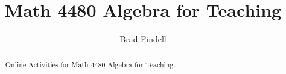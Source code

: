 \documentclass[numbers,nooutcomes,twoside,handout,hints]{xourse}
\title{Math 4480 Algebra for Teaching}
\author{Brad Findell}
\begin{document}
\begin{abstract}
Online Activities for Math 4480 Algebra for Teaching.
\end{abstract}
\maketitle

\end{document}

